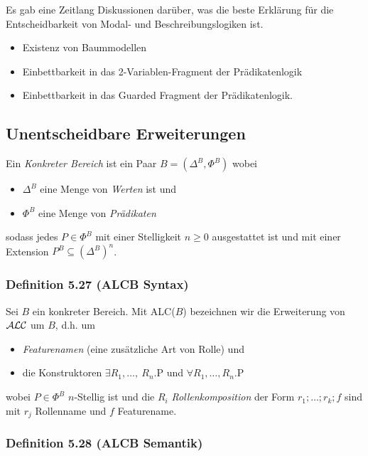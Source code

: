 Es gab eine Zeitlang Diskussionen darüber, was die beste Erklärung für die Entscheidbarkeit von Modal- und Beschreibungslogiken ist.
\begin{itemize}
    \item Existenz von Baummodellen
    \item Einbettbarkeit in das 2-Variablen-Fragment der Prädikatenlogik
    \item Einbettbarkeit in das Guarded Fragment der Prädikatenlogik.
\end{itemize}

\subsection{Unentscheidbare
Erweiterungen}\label{unentscheidbare-erweiterungen}

Ein \emph{Konkreter Bereich} ist ein Paar $B = (\Delta^{B},\Phi^{B})$
wobei

\begin{itemize}
\item
  $\Delta^{B}$ eine Menge von \emph{Werten} ist und
\item
  $\Phi^{B}$ eine Menge von \emph{Prädikaten}
\end{itemize}

sodass jedes $P \in \Phi^{B}$ mit einer Stelligkeit $n \geq 0$
ausgestattet ist und mit einer Extension
$P^{B} \subseteq \left( \Delta^{B} \right)^{n}$.

\subsubsection{Definition 5.27 (ALCB
Syntax)}\label{definition-5.27-alcb-syntax}

Sei $B$ ein konkreter Bereich. Mit ALC($B$) bezeichnen wir die
Erweiterung von $\mathcal{A}\mathcal{L}\mathcal{C}$ um $B$, d.h. um

\begin{itemize}
\item
  \emph{Featurenamen} (eine zusätzliche Art von Rolle) und
\item
  die Konstruktoren $\exists R_1,\ldots,\ R_{n}\text{.P}$ und
  $\forall R_1,\ldots,R_{n}\text{.P}$
\end{itemize}

wobei $P \in \Phi^{B}$ $n$-Stellig ist und die $R_{i}$
\emph{Rollenkomposition} der Form $r_1;\ldots;r_{k};f$ sind mit
$r_{j}$ Rollenname und $f$ Featurename.

\subsubsection{Definition 5.28 (ALCB
Semantik)}\label{definition-5.28-alcb-semantik}

